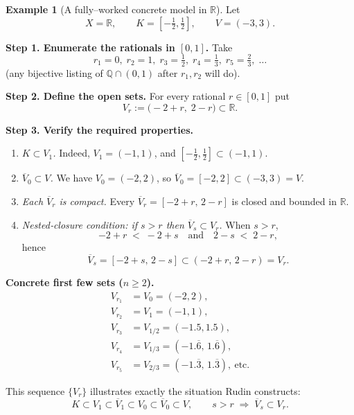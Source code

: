 \documentclass[12pt]{article}
\theoremstyle{definition} %
\newtheorem{example}{Example}
\theoremstyle{plain} %
\begin{document}
    \begin{example}[A fully–worked concrete model in $\mathbb{R}$]
      Let  
      \[
         X=\mathbb{R}, \qquad 
         K=[{-}\tfrac12,\tfrac12], \qquad 
         V=(-3,3).
      \]
      
      \medskip
      \noindent
      \textbf{Step 1.  Enumerate the rationals in $[0,1]$.}  
      Take
      \[
        r_{1}=0,\; r_{2}=1,\; r_{3}=\tfrac12,\; r_{4}=\tfrac13,\; r_{5}=\tfrac23,\;\dotsc
      \]
      (any bijective listing of $\mathbb{Q}\cap(0,1)$ after $r_{1},r_{2}$ will do).
      
      \medskip
      \noindent
      \textbf{Step 2.  Define the open sets.}  
      For every rational $r\in[0,1]$ put
      \[
         V_{r}:=\bigl(-2+r,\;2-r\bigr)\subset\mathbb{R}.
      \]
      
      \medskip
      \noindent
      \textbf{Step 3.  Verify the required properties.}
      \begin{enumerate}
          \item \emph{$K\subset V_{1}$.}  
                Indeed, $V_{1}=(-1,1)$, and $[-\tfrac12,\tfrac12]\subset(-1,1)$.
      
          \item \emph{$\overline{V}_{0}\subset V$.}  
                We have $V_{0}=(-2,2)$, so $\overline{V}_{0}=[-2,2]\subset(-3,3)=V$.
      
          \item \emph{Each $\overline{V}_{r}$ is compact.}  
                Every $\overline{V}_{r}=[-2+r,\,2-r]$ is closed and bounded in $\mathbb{R}$.
      
          \item \emph{Nested‐closure condition:  
                if $s>r$ then $\overline{V}_{s}\subset V_{r}$.}  
                When $s>r$,
                \[
                     -2+r \;<\; -2+s 
                     \quad\text{and}\quad 
                     2-s \;<\; 2-r,
                \]
                hence
                \[
                  \overline{V}_{s}
                    =[-2+s,\,2-s]
                    \subset(-2+r,\,2-r)
                    =V_{r}.
                \]
      \end{enumerate}
      
      \medskip
      \noindent
      \textbf{Concrete first few sets ($n\ge 2$).}
      \[
      \begin{aligned}
        V_{r_{1}} &=V_{0}=(-2,2),\\
        V_{r_{2}} &=V_{1}=(-1,1),\\[2pt]
        V_{r_{3}} &=V_{1/2}=(-1.5,1.5),\\
        V_{r_{4}} &=V_{1/3}=(-1.\overline{6},\,1.\overline{6}),\\
        V_{r_{5}} &=V_{2/3}=(-1.\overline{3},\,1.\overline{3}),\ \text{etc.}
      \end{aligned}
      \]
      
      This sequence $\{V_{r}\}$ illustrates exactly the situation Rudin constructs:
      \[
         K\subset V_{1}\subset\overline{V}_{1}\subset V_{0}\subset\overline{V}_{0}\subset V,
         \qquad
         s>r\;\Longrightarrow\; \overline{V}_{s}\subset V_{r}.
      \]
      \end{example}
\end{document}
